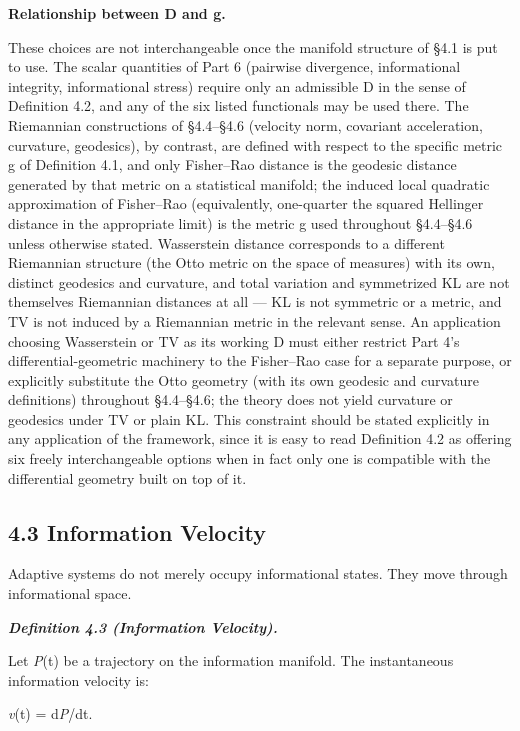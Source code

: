 \documentclass[
]{article}
\begin{document}
\textbf{Relationship between D and g.}

These choices are not interchangeable once the manifold structure of
§4.1 is put to use. The scalar quantities of Part 6 (pairwise
divergence, informational integrity, informational stress) require only
an admissible D in the sense of Definition 4.2, and any of the six
listed functionals may be used there. The Riemannian constructions of
§4.4--§4.6 (velocity norm, covariant acceleration, curvature,
geodesics), by contrast, are defined with respect to the specific metric
g of Definition 4.1, and only Fisher--Rao distance is the geodesic
distance generated by that metric on a statistical manifold; the induced
local quadratic approximation of Fisher--Rao (equivalently, one-quarter
the squared Hellinger distance in the appropriate limit) is the metric g
used throughout §4.4--§4.6 unless otherwise stated. Wasserstein distance
corresponds to a different Riemannian structure (the Otto metric on the
space of measures) with its own, distinct geodesics and curvature, and
total variation and symmetrized KL are not themselves Riemannian
distances at all --- KL is not symmetric or a metric, and TV is not
induced by a Riemannian metric in the relevant sense. An application
choosing Wasserstein or TV as its working D must either restrict Part
4's differential-geometric machinery to the Fisher--Rao case for a
separate purpose, or explicitly substitute the Otto geometry (with its
own geodesic and curvature definitions) throughout §4.4--§4.6; the
theory does not yield curvature or geodesics under TV or plain KL. This
constraint should be stated explicitly in any application of the
framework, since it is easy to read Definition 4.2 as offering six
freely interchangeable options when in fact only one is compatible with
the differential geometry built on top of it.

\hypertarget{information-velocity}{%
\subsection{4.3 Information Velocity}\label{information-velocity}}

Adaptive systems do not merely occupy informational states. They move
through informational space.

\emph{\textbf{Definition 4.3 (Information Velocity).}}

Let \emph{P}(t) be a trajectory on the information manifold. The
instantaneous information velocity is:

\emph{v}(t) = d\emph{P}/dt.
\end{document}
